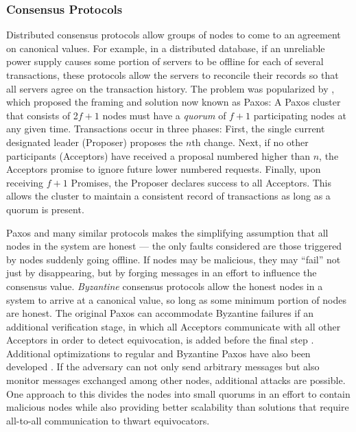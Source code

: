   \subsubsection{Consensus Protocols}
    Distributed consensus protocols allow groups of nodes to come to an
    agreement on canonical values. For example, in a distributed database, if an
    unreliable power supply causes some portion of servers to be offline for
    each of several transactions, these protocols allow the
    servers to reconcile their records so that all servers agree on the
    transaction history. The problem was popularized by
    \cite{lamport_part-time_1998}, which proposed the framing and solution now
    known as Paxos: A Paxos cluster that consists of 2$f+1$ nodes must have a
    \emph{quorum} of $f + 1$ participating nodes at any given time.
    Transactions occur in three phases: First, the single current designated
    leader (Proposer) proposes the $n$th change. Next, if no other participants
    (Acceptors) have received a proposal numbered higher than $n$, the Acceptors
    promise to ignore future lower numbered requests.  Finally, upon receiving
    $f+1$ Promises, the Proposer declares success to all Acceptors. This allows
    the cluster to maintain a consistent record of transactions as long as a
    quorum is present.

    Paxos and many similar protocols makes the simplifying assumption that all
    nodes in the system are honest --- the only faults considered are those
    triggered by nodes suddenly going offline. If nodes may be malicious, they
    may ``fail'' not just by disappearing, but by forging messages in an effort
    to influence the consensus value. \emph{Byzantine} consensus protocols allow
    the honest nodes in a system to arrive at a canonical value, so long as some
    minimum portion of nodes are honest. The original Paxos can
    accommodate Byzantine failures if an additional verification stage, in which
    all Acceptors communicate with all other Acceptors in order to detect
    equivocation, is added before the final step \cite{castro_practical_1999}.
    Additional optimizations to regular and Byzantine Paxos have also been
    developed \cite{lamport_fast_2006}. If the adversary can not only send
    arbitrary messages but also monitor messages exchanged among other nodes,
    additional attacks are possible. One approach to this divides the nodes into
    small quorums in an effort to contain malicious nodes \cite{king_load_2011}
    while also providing better scalability than solutions that require
    all-to-all communication to thwart equivocators.


